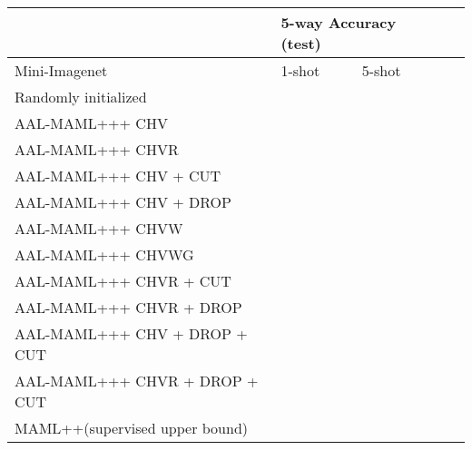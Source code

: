 \documentclass{article}
\newcommand{\umaml}{AAL-MAML++}
\newcommand{\maml}{MAML++}
\begin{document}
\begin{table*}[!ht]
\begin{center}
\begin{tabular}{|l|l|l|l|l|}
\hline
                        & \multicolumn{2}{l|}{5-way Accuracy (test)}  \\ \hline
Mini-Imagenet                                     & 1-shot             &5-shot           \\ \hline  
Randomly initialized                              &  & \\ \hline  
\umaml + CHV                                &  &\\\hline
\umaml + CHVR                     &  &\\\hline
\umaml + CHV  + CUT                       &  &\\\hline
\umaml + CHV  + DROP                      &  &\\\hline
\umaml + CHVW                       &  &\\\hline
\umaml + CHVWG                      &  &\\\hline
\umaml + CHVR + CUT            &  &\\\hline
\umaml + CHVR + DROP           &  &\\\hline
\umaml + CHV  + DROP + CUT             &  &\\\hline
\umaml + CHVR + DROP + CUT &  &\\\hline
\maml (supervised upper bound)                    &  &\\\hline


\end{tabular}
\caption{\umaml ablation studies.}
\label{table:umaml-ablation-mini-imagenet}
\end{center}
\vspace{-4mm}
\end{table*}
\end{document}
